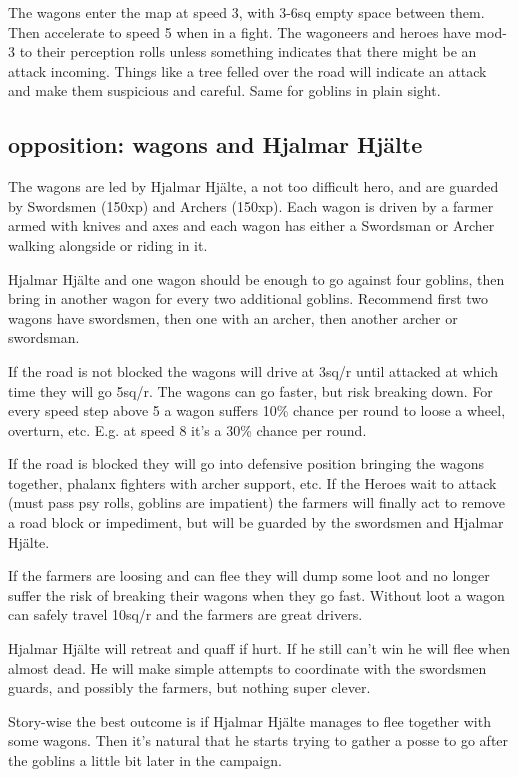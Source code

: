 The wagons enter the map at speed 3, with 3-6sq empty space between them. Then accelerate to speed 5 when in a fight. The wagoneers and heroes have mod-3 to their perception rolls unless something indicates that there might be an attack incoming. Things like a tree felled over the road will indicate an attack and make them suspicious and careful. Same for goblins in plain sight.


\subsection*{opposition: wagons and Hjalmar Hjälte}

The wagons are led by Hjalmar Hjälte, a not too difficult hero, and are guarded by Swordsmen (150xp) and Archers (150xp). Each wagon is driven by a farmer armed with knives and axes and each wagon has either a Swordsman or Archer walking alongside or riding in it.

Hjalmar Hjälte and one wagon should be enough to go against four goblins, then bring in another wagon for every two additional goblins. Recommend first two wagons have swordsmen, then one with an archer, then another archer or swordsman.

If the road is not blocked the wagons will drive at 3sq/r until attacked at which time they will go 5sq/r. The wagons can go faster, but risk breaking down. For every speed step above 5 a wagon suffers 10\% chance per round to loose a wheel, overturn, etc. E.g. at speed 8 it's a 30\% chance per round.

If the road is blocked they will go into defensive position bringing the wagons together, phalanx fighters with archer support, etc. If the Heroes wait to attack (must pass psy rolls, goblins are impatient) the farmers will finally act to remove a road block or impediment, but will be guarded by the swordsmen and Hjalmar Hjälte.

If the farmers are loosing and can flee they will dump some loot and no longer suffer the risk of breaking their wagons when they go fast. Without loot a wagon can safely travel 10sq/r and the farmers are great drivers.

Hjalmar Hjälte will retreat and quaff if hurt. If he still can't win he will flee when almost dead. He will make simple attempts to coordinate with the swordsmen guards, and possibly the farmers, but nothing super clever.

Story-wise the best outcome is if Hjalmar Hjälte manages to flee together with some wagons. Then it's natural that he starts trying to gather a posse to go after the goblins a little bit later in the campaign.


